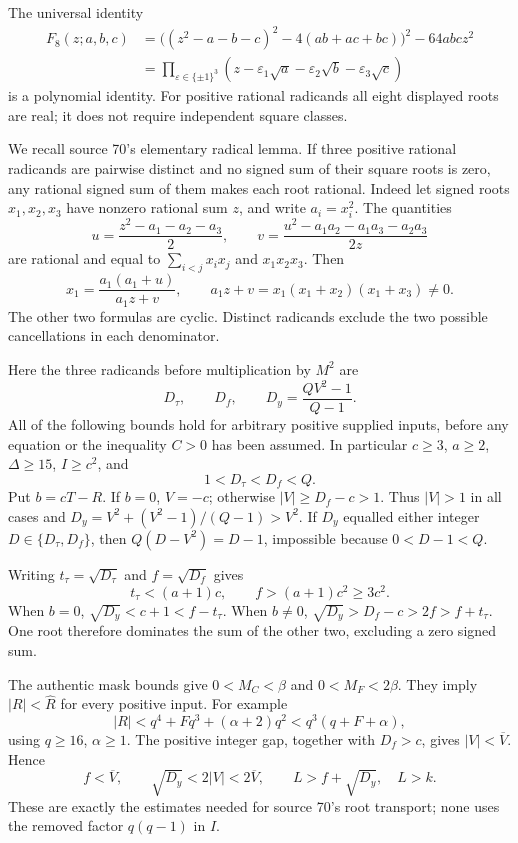 The universal identity
\begin{align*}
 F_8(z;a,b,c)
 &=\bigl((z^2-a-b-c)^2-4(ab+ac+bc)\bigr)^2-64abc z^2\\
 &=\prod_{\varepsilon\in\{\pm1\}^3}
   (z-\varepsilon_1\sqrt a-\varepsilon_2\sqrt b-\varepsilon_3\sqrt c)
\end{align*}
is a polynomial identity. For positive rational radicands all eight
displayed roots are real; it does not require independent square classes.

We recall source 70's elementary radical lemma. If three positive rational
radicands are pairwise distinct and no signed sum of their square roots
is zero, any rational signed sum of them makes each root rational.
Indeed let signed roots $x_1,x_2,x_3$ have nonzero rational sum $z$,
and write $a_i=x_i^2$. The quantities
\[
 u=\frac{z^2-a_1-a_2-a_3}{2},\qquad
 v=\frac{u^2-a_1a_2-a_1a_3-a_2a_3}{2z}
\]
are rational and equal to $\sum_{i<j}x_ix_j$ and $x_1x_2x_3$.
Then
\[
 x_1=\frac{a_1(a_1+u)}{a_1z+v},\qquad
 a_1z+v=x_1(x_1+x_2)(x_1+x_3)\ne0.
\]
The other two formulas are cyclic. Distinct radicands exclude the two
possible cancellations in each denominator.

Here the three radicands before multiplication by $M^2$ are
\[
 D_\tau,\qquad D_f,\qquad D_y=\frac{QV^2-1}{Q-1}.
\]
All of the following bounds hold for arbitrary positive supplied inputs,
before any equation or the inequality $C>0$ has been assumed. In
particular $c\ge3$, $a\ge2$, $\Delta\ge15$, $I\ge c^2$, and
\[
 1<D_\tau<D_f<Q.
\]
Put $b=cT-R$. If $b=0$, $V=-c$; otherwise
$|V|\ge D_f-c>1$. Thus $|V|>1$ in all cases and
$D_y=V^2+(V^2-1)/(Q-1)>V^2$.
If $D_y$ equalled either integer $D\in\{D_\tau,D_f\}$, then
$Q(D-V^2)=D-1$, impossible because $0<D-1<Q$.

Writing $t_\tau=\sqrt{D_\tau}$ and $f=\sqrt{D_f}$ gives
\[
 t_\tau<(a+1)c,\qquad f>(a+1)c^2\ge3c^2.
\]
When $b=0$, $\sqrt{D_y}<c+1<f-t_\tau$. When $b\ne0$,
$\sqrt{D_y}>D_f-c>2f>f+t_\tau$. One root therefore dominates
the sum of the other two, excluding a zero signed sum.

The authentic mask bounds give
$0<M_C<\beta$ and $0<M_F<2\beta$. They imply
$|R|<\widehat R$ for every positive input. For example
\[
 |R|<q^4+Fq^3+(\alpha+2)q^2<q^3(q+F+\alpha),
\]
using $q\ge16$, $\alpha\ge1$. The positive integer gap, together with
$D_f>c$, gives $|V|<\overline V$. Hence
\[
 f<\overline V,\qquad \sqrt{D_y}<2|V|<2\overline V,
 \qquad L>f+\sqrt{D_y},\quad L>k.
\]
These are exactly the estimates needed for source 70's root transport;
none uses the removed factor $q(q-1)$ in $I$.


